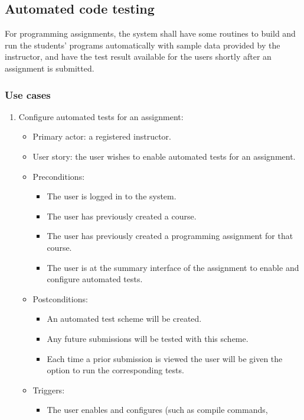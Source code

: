\subsection{Automated code testing}
\label{sec:AUTOTEST}
For programming assignments, the system shall have some routines to build and
run the students' programs automatically with sample data provided by the
instructor, and have the test result available for the users shortly after an
assignment is submitted.

\subsubsection{Use cases}
\begin{enumerate}
\item Configure automated tests for an assignment:
\begin{itemize}
    \item Primary actor: a registered instructor.
    \item User story: the user wishes to enable automated tests for an
        assignment.
    \item Preconditions:
        \begin{itemize}
            \item The user is logged in to the system.
            \item The user has previously created a course.
            \item The user has previously created a programming assignment for
                that course.
            \item The user is at the summary interface of the assignment to
                enable and configure automated tests.
        \end{itemize}
    \item Postconditions:
        \begin{itemize}
            \item An automated test scheme will be created.
            \item Any future submissions will be tested with this scheme.
            \item Each time a prior submission is viewed the user will be given
                the option to run the corresponding tests.
        \end{itemize}
    \item Triggers:
        \begin{itemize}
            \item The user enables and configures (such as compile commands, 

\end{itemize}
\end{itemize}
\end{enumerate}
